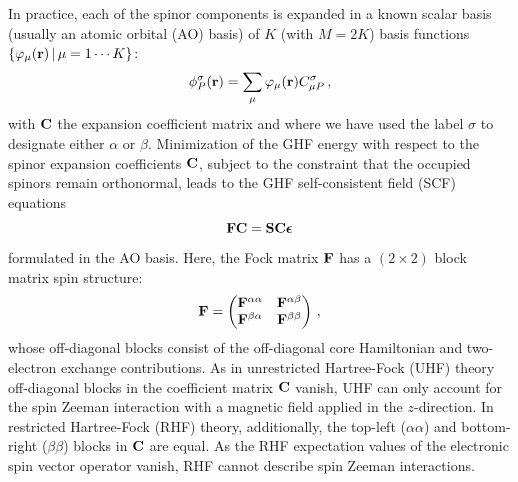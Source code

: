 \documentclass[journal=jctc,manuscript=article]{achemso}
\begin{document}
        In practice, each of the spinor components is expanded in a known scalar basis (usually an atomic orbital (AO) basis) of $K$ (with $M=2K$) basis functions $\{ \varphi_{\mu}(\vb{r}) \thinspace | \thinspace \mu = 1 \cdots K \}$:
        \begin{equation}
            \phi_P^\sigma(\vb{r})
            = \sum_\mu \varphi_\mu(\vb{r}) C^{\sigma}_{\mu P}
            \thinspace ,
        \end{equation}
        with $\vb{C}$ the expansion coefficient matrix and where we have used the label $\sigma$ to designate either $\alpha$ or $\beta$.
        Minimization of the GHF energy with respect to the spinor expansion coefficients $\vb{C}$, subject to the constraint that the occupied spinors remain orthonormal, leads to the GHF self-consistent field (SCF) equations
        \begin{equation}
            \vb{F} \vb{C} = \vb{S} \vb{C} \boldsymbol{\epsilon}
        \end{equation}
        formulated in the AO basis.
        Here, the Fock matrix $\vb{F}$ has a $(2 \times 2)$ block matrix spin structure:
        \begin{equation}
            \vb{F}
            = \begin{pmatrix}
                \vb{F}^{\alpha \alpha}
                    & \vb{F}^{\alpha \beta} \\
                \vb{F}^{\beta \alpha}
                    & \vb{F}^{\beta \beta}
            \end{pmatrix}
            \thinspace ,
        \end{equation}
        whose off-diagonal blocks consist of the off-diagonal core Hamiltonian and two-electron exchange contributions.\cite{Sen.2018, Sun.2019}
        As in unrestricted Hartree-Fock (UHF) theory off-diagonal blocks in the coefficient matrix $\vb{C}$ vanish, UHF can only account for the spin Zeeman interaction with a magnetic field applied in the $z$-direction.
        In restricted Hartree-Fock (RHF) theory, additionally, the top-left ($\alpha \alpha$) and bottom-right ($\beta \beta$) blocks in $\vb{C}$ are equal.
        As the RHF expectation values of the electronic spin vector operator vanish, RHF cannot describe spin Zeeman interactions.
\end{document}
